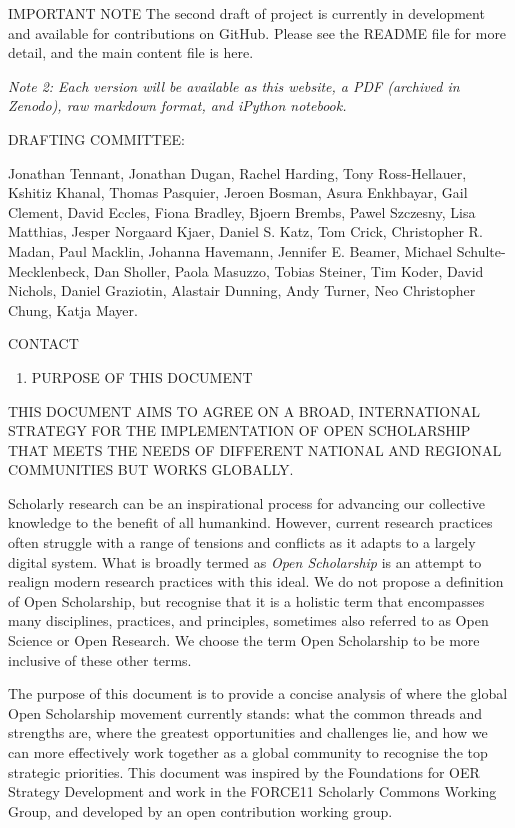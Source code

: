 \documentclass[]{article}
\providecommand{\tightlist}{%
  \setlength{\itemsep}{0pt}\setlength{\parskip}{0pt}}
\begin{document}
IMPORTANT NOTE The second draft of project is currently in development
and available for contributions on GitHub. Please see the README file
for more detail, and the main content file is here.

\emph{Note 2: Each version will be available as this website, a PDF
(archived in Zenodo), raw markdown format, and iPython notebook.}

DRAFTING COMMITTEE:

Jonathan Tennant, Jonathan Dugan, Rachel Harding, Tony Ross-Hellauer,
Kshitiz Khanal, Thomas Pasquier, Jeroen Bosman, Asura Enkhbayar, Gail
Clement, David Eccles, Fiona Bradley, Bjoern Brembs, Pawel Szczesny,
Lisa Matthias, Jesper Norgaard Kjaer, Daniel S. Katz, Tom Crick,
Christopher R. Madan, Paul Macklin, Johanna Havemann, Jennifer E.
Beamer, Michael Schulte-Mecklenbeck, Dan Sholler, Paola Masuzzo, Tobias
Steiner, Tim Koder, David Nichols, Daniel Graziotin, Alastair Dunning,
Andy Turner, Neo Christopher Chung, Katja Mayer.

CONTACT

\begin{enumerate}
\def\labelenumi{\arabic{enumi}.}
\tightlist
\item
  PURPOSE OF THIS DOCUMENT
\end{enumerate}

THIS DOCUMENT AIMS TO AGREE ON A BROAD, INTERNATIONAL STRATEGY FOR THE
IMPLEMENTATION OF OPEN SCHOLARSHIP THAT MEETS THE NEEDS OF DIFFERENT
NATIONAL AND REGIONAL COMMUNITIES BUT WORKS GLOBALLY.

Scholarly research can be an inspirational process for advancing our
collective knowledge to the benefit of all humankind. However, current
research practices often struggle with a range of tensions and conflicts
as it adapts to a largely digital system. What is broadly termed as
\emph{Open Scholarship} is an attempt to realign modern research
practices with this ideal. We do not propose a definition of Open
Scholarship, but recognise that it is a holistic term that encompasses
many disciplines, practices, and principles, sometimes also referred to
as Open Science or Open Research. We choose the term Open Scholarship to
be more inclusive of these other terms.

The purpose of this document is to provide a concise analysis of where
the global Open Scholarship movement currently stands: what the common
threads and strengths are, where the greatest opportunities and
challenges lie, and how we can more effectively work together as a
global community to recognise the top strategic priorities. This
document was inspired by the Foundations for OER Strategy Development
and work in the FORCE11 Scholarly Commons Working Group, and developed
by an open contribution working group.
\end{document}
